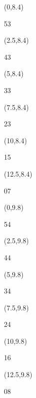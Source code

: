 \documentclass[a4paper]{article}
\newcommand{\myseat}[4]{%
	\vspace{0.1cm}
	\parbox[t][2.5cm][t]{3.5cm}{
	\small #1 %
	\begin{description}
	\vspace{-0.1cm}
	\item [ID:] #2
	\vspace{-0.1cm}
	\item [Team:] #3 \normalsize
	\vspace{-0.1cm}
	\item \normalsize #4
	\vspace{-0.1cm}
	\end{description}
	}
}
\begin{document}
\begin{textblock}{2.5}(0,8.4)
\textblockcolor{}
\myseat{53}{}{}{}
\end{textblock}

\begin{textblock}{2.5}(2.5,8.4)
\textblockcolor{}
\myseat{43}{}{}{}
\end{textblock}

\begin{textblock}{2.5}(5,8.4)
\textblockcolor{}
\myseat{33}{}{}{}
\end{textblock}

\begin{textblock}{2.5}(7.5,8.4)
\textblockcolor{}
\myseat{23}{}{}{}
\end{textblock}

\begin{textblock}{2.5}(10,8.4)
\textblockcolor{}
\myseat{15}{}{}{}
\end{textblock}

\begin{textblock}{2.5}(12.5,8.4)
\textblockcolor{}
\myseat{07}{}{}{}
\end{textblock}

\begin{textblock}{2.5}(0,9.8)
\textblockcolor{}
\myseat{54}{}{}{}
\end{textblock}

\begin{textblock}{2.5}(2.5,9.8)
\textblockcolor{}
\myseat{44}{}{}{}
\end{textblock}

\begin{textblock}{2.5}(5,9.8)
\textblockcolor{}
\myseat{34}{}{}{}
\end{textblock}

\begin{textblock}{2.5}(7.5,9.8)
\textblockcolor{}
\myseat{24}{}{}{}
\end{textblock}

\begin{textblock}{2.5}(10,9.8)
\textblockcolor{}
\myseat{16}{}{}{}
\end{textblock}

\begin{textblock}{2.5}(12.5,9.8)
\textblockcolor{}
\myseat{08}{}{}{}
\end{textblock}
\end{document}
